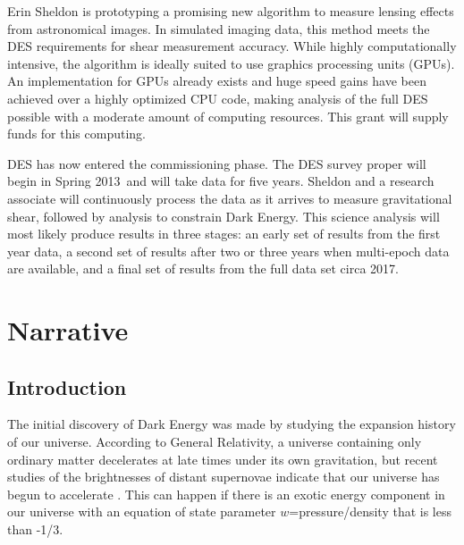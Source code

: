 \documentclass[12pt]{article}
\newcommand{\surveyproper}{Spring 2013}
\begin{document}
Erin Sheldon is prototyping a promising new algorithm to measure lensing
effects from astronomical images.  In simulated imaging data, this method meets
the DES requirements for shear measurement accuracy. While highly
computationally intensive, the algorithm is ideally suited to use graphics
processing units (GPUs). An implementation for GPUs already exists and huge
speed gains have been achieved over a highly optimized CPU code, making
analysis of the full DES possible with a moderate amount of computing
resources.   This grant will supply funds for this computing.

DES has now entered the commissioning phase.  The DES survey proper will begin
in \surveyproper\ and will take data for five years. Sheldon and a research
associate will continuously process the data as it arrives to measure
gravitational shear, followed by analysis to constrain Dark Energy.  This
science analysis will most likely produce results in three stages: an early set
of results from the first year data, a second set of results after two or three
years when multi-epoch data are available, and a final set of results from the
full data set circa 2017.


\newpage
{}
\section*{Narrative}
\setcounter{section}{1}
\subsection{Introduction}

The initial discovery of Dark Energy was made by studying the expansion history
of our universe.  According to General Relativity, a universe containing only
ordinary matter decelerates at late times under its own gravitation, but recent
studies of the brightnesses of distant supernovae indicate that our universe
has begun to accelerate \cite{Riess98,Perlmutter99}.  This can happen if there
is an exotic energy component in our universe with an equation of state
parameter $w$=pressure/density that is less than -1/3.
\end{document}
